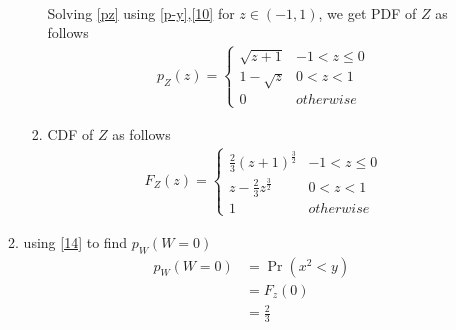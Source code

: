 \documentclass[journal,12pt,twocolumn]{IEEEtran}
\begin{document}
\begin{enumerate}
\begin{enumerate}
\begin{enumerate}
\begin{align}
\end{align}
Solving \eqref{pz} using \eqref{p-y},\eqref{10} for $z \in (-1,1)$, we get PDF of $Z$ as follows
\begin{align}
p_{Z}(z)  = 
\begin{cases}
      \sqrt{z+1} & -1 < z \leq 0 \\
      1-\sqrt{z} & 0 < z <1 \\
      0 & otherwise 
\end{cases} \label{13}
\end{align}
\item CDF of $Z$ as follows
\begin{align}
F_{Z}(z)  = 
\begin{cases}
      \frac{2}{3}{(z+1)}^\frac{3}{2} & -1 < z \leq 0 \\
      z-\frac{2}{3}{z}^\frac{3}{2} & 0 < z < 1 \\
      1 & otherwise
\end{cases} \label{14}
\end{align}

\end{enumerate}

\item using \eqref{14} to find $p_W(W=0)$
\begin{align}
p_W(W=0) &=\Pr(x^2 <y) \\
         &=F_z(0) \\
         &=\frac{2}{3} \label{15}
\end{align}


\end{enumerate}
\end{enumerate}
\end{document}
